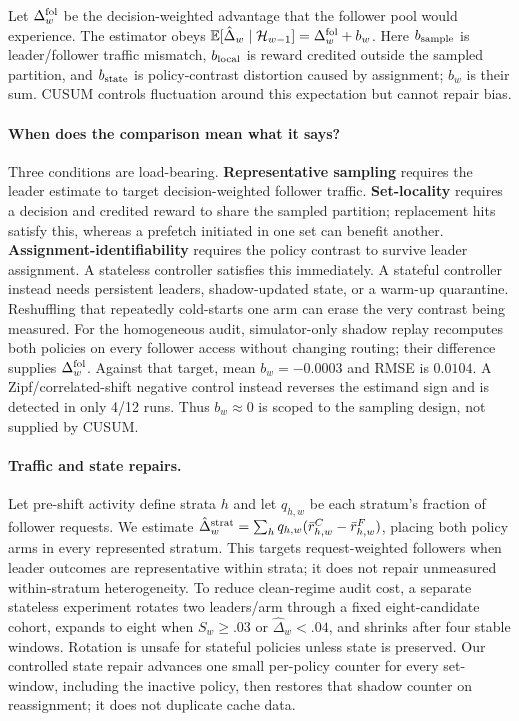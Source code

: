 \documentclass{article}
\newcommand{\dhat}{\hat{\Delta}}
\begin{document}
Let $\Delta_w^{\rm fol}$ be the decision-weighted advantage that the follower
pool would experience.  The estimator obeys
$\mathbb E[\dhat_w\mid\mathcal H_{w-1}]=\Delta_w^{\rm fol}+b_w$.  Here
$b_{\rm sample}$ is leader/follower traffic mismatch, $b_{\rm local}$ is reward
credited outside the sampled partition, and $b_{\rm state}$ is policy-contrast
distortion caused by assignment; $b_w$ is their sum.  CUSUM controls fluctuation
around this expectation but cannot repair bias.

\paragraph{When does the comparison mean what it says?}
Three conditions are load-bearing.  \textbf{Representative sampling} requires
the leader estimate to target decision-weighted follower traffic.
\textbf{Set-locality} requires a decision and credited reward to share the
sampled partition; replacement hits satisfy this, whereas a prefetch initiated
in one set can benefit another.  \textbf{Assignment-identifiability} requires the
policy contrast to survive leader assignment.  A stateless controller satisfies
this immediately.  A stateful controller instead needs persistent leaders,
shadow-updated state, or a warm-up quarantine.  Reshuffling that repeatedly
cold-starts one arm can erase the very contrast being measured.
For the homogeneous audit, simulator-only shadow replay recomputes both policies
on every follower access without changing routing; their difference supplies
$\Delta_w^{\rm fol}$.  Against that target, mean $b_w=-0.0003$ and RMSE is
$0.0104$.  A Zipf/correlated-shift negative control instead reverses the estimand
sign and is detected in only 4/12 runs.  Thus $b_w\approx0$ is scoped to the
sampling design, not supplied by CUSUM.

\paragraph{Traffic and state repairs.}
Let pre-shift activity define strata $h$ and let $q_{h,w}$ be each stratum's
fraction of follower requests.  We estimate
$\dhat_w^{\rm strat}=\sum_hq_{h,w}(\bar r^C_{h,w}-\bar r^F_{h,w})$, placing both
policy arms in every represented stratum.  This targets request-weighted
followers when leader outcomes are representative within strata; it does not
repair unmeasured within-stratum heterogeneity.  To reduce clean-regime audit
cost, a separate stateless experiment rotates two leaders/arm through a fixed
eight-candidate cohort, expands to eight when $S_w\ge.03$ or $\dhat_w<.04$, and
shrinks after four stable windows.  Rotation is unsafe for stateful policies
unless state is preserved.  Our controlled state repair advances one small
per-policy counter for every set-window, including the inactive policy, then
restores that shadow counter on reassignment; it does not duplicate cache data.
\end{document}
